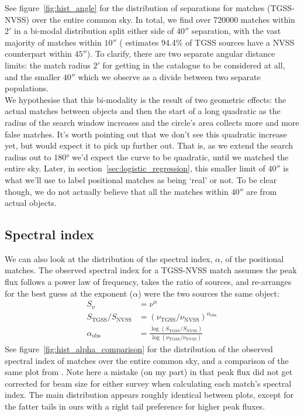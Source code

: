 \documentclass[12pt,a4paper]{article}
\begin{document}
See figure~\ref{fig:hist_angle} for the distribution of separations for matches (TGSS-NVSS) over the entire common sky. In total, we find over 720000 matches within $\ang{;2;}$ in a bi-modal distribution split either side of $\ang{;;40}$ separation, with the vast majority of matches within $\ang{;;10}$ (\citet{tgss} estimates 94.4\% of TGSS sources have a NVSS counterpart within $\ang{;;45}$). To clarify, there are two separate angular distance limits: the match radius $\ang{;2;}$ for getting in the catalogue to be considered at all, and the smaller $\ang{;;40}$ which we observe as a divide between two separate populations.\\

We hypothesise that this bi-modality is the result of two geometric effects: the actual matches between objects and then the start of a long quadratic as the radius of the search window increases and the circle's area collects more and more false matches. It's worth pointing out that we don't see this quadratic increase yet, but would expect it to pick up further out. That is, as we extend the search radius out to $\ang{180}$ we'd expect the curve to be quadratic, until we matched the entire sky. Later, in section~\ref{sec:logistic_regression}, this smaller limit of $\ang{;;40}$ is what we'll use to label positional matches as being `real' or not. To be clear though, we do not actually believe that all the matches within $\ang{;;40}$ are from actual objects.

\subsection{Spectral index}
\label{sec:spectral_index}
We can also look at the distribution of the spectral index, $\alpha$, of the positional matches. The observed spectral index for a TGSS-NVSS match assumes the peak flux follows a power law of frequency, takes the ratio of sources, and re-arranges for the best guess at the exponent ($\alpha$) were the two sources the same object:
\begin{equation}
\label{eq:alpha}
\begin{split}
S_\nu &= \nu^\alpha \\
S_\mathrm{TGSS}/S_\mathrm{NVSS} &= (\nu_\mathrm{TGSS}/\nu_\mathrm{NVSS})^{\alpha_\mathrm{obs}} \\
\alpha_\mathrm{obs} &= \frac{\log(S_\mathrm{TGSS}/S_\mathrm{NVSS})}{\log(\nu_\mathrm{TGSS}/\nu_\mathrm{NVSS})}
\end{split}
\end{equation}
See figure~\ref{fig:hist_alpha_comparison} for the distribution of the observed spectral index of matches over the entire common sky, and a comparison of the same plot from \citet{posmatchpaper}. Note here a mistake (on my part) in that peak flux did not get corrected for beam size for either survey when calculating each match's spectral index. The main distribution appears roughly identical between plots, except for the fatter tails in ours with a right tail preference for higher peak fluxes.\\
\end{document}
